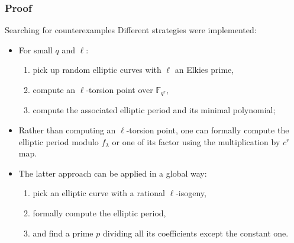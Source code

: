 \documentclass[francais]{beamer}
\def\F {\ensuremath{\mathbb{F}}}
\begin{document}
\begin{frame}\frametitle{Proof}
  \begin{center}
    \vspace{-3em}
  \end{center}
\end{frame}

\begin{frame}{Searching for counterexamples}
  Different strategies were implemented:
  \begin{itemize}
  \item For small $q$ and $\ell$:
    \begin{enumerate}
    \item pick up random elliptic curves with $\ell$ an Elkies prime,
    \item compute an $\ell$-torsion point over $\F_{q^r}$,
    \item compute the associated elliptic period and its minimal polynomial;
    \end{enumerate}
  \item Rather than computing an $\ell$-torsion point, one can formally
    compute the elliptic period modulo $f_\lambda$ or one of its factor
    using the multiplication by $c^r$ map.
  \item The latter approach can be applied in a global way:
    \begin{enumerate}
    \item pick an elliptic curve with a rational $\ell$-isogeny,
    \item formally compute the elliptic period,
    \item and find a prime $p$ dividing all its coefficients except the constant one.
    \end{enumerate}
  \end{itemize}
\end{frame}
\end{document}

